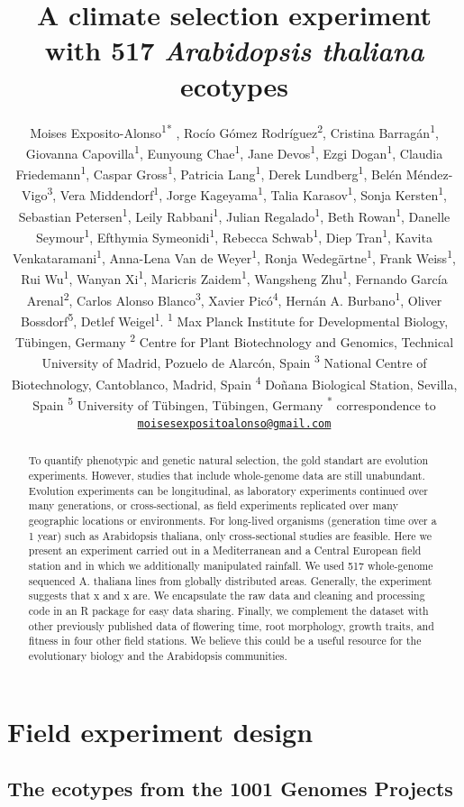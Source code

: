 \documentclass[12pt,]{article}
\title{A climate selection experiment with 517 \emph{Arabidopsis thaliana}
ecotypes}
\author{\newline \normalfont Moises
Exposito-Alonso\textsuperscript{1}\textsuperscript{*} , Rocío Gómez
Rodríguez\textsuperscript{2}, Cristina Barragán\textsuperscript{1},
Giovanna Capovilla\textsuperscript{1}, Eunyoung Chae\textsuperscript{1},
Jane Devos\textsuperscript{1}, Ezgi Dogan\textsuperscript{1}, Claudia
Friedemann\textsuperscript{1}, Caspar Gross\textsuperscript{1}, Patricia
Lang\textsuperscript{1}, Derek Lundberg\textsuperscript{1}, Belén
Méndez-Vigo\textsuperscript{3}, Vera Middendorf\textsuperscript{1},
Jorge Kageyama\textsuperscript{1}, Talia Karasov\textsuperscript{1},
Sonja Kersten\textsuperscript{1}, Sebastian Petersen\textsuperscript{1},
Leily Rabbani\textsuperscript{1}, Julian Regalado\textsuperscript{1},
Beth Rowan\textsuperscript{1}, Danelle Seymour\textsuperscript{1},
Efthymia Symeonidi\textsuperscript{1}, Rebecca
Schwab\textsuperscript{1}, Diep Tran\textsuperscript{1}, Kavita
Venkataramani\textsuperscript{1}, Anna-Lena Van de
Weyer\textsuperscript{1}, Ronja Wedegärtne\textsuperscript{1}, Frank
Weiss\textsuperscript{1}, Rui Wu\textsuperscript{1}, Wanyan
Xi\textsuperscript{1}, Maricris Zaidem\textsuperscript{1}, Wangsheng
Zhu\textsuperscript{1}, Fernando García Arenal\textsuperscript{2},
Carlos Alonso Blanco\textsuperscript{3}, Xavier Picó\textsuperscript{4},
Hernán A. Burbano\textsuperscript{1}, Oliver
Bossdorf\textsuperscript{5}, Detlef Weigel\textsuperscript{1}.
\newline \newline \textsuperscript{1} Max Planck Institute for
Developmental Biology, Tübingen, Germany \newline \textsuperscript{2}
Centre for Plant Biotechnology and Genomics, Technical University of
Madrid, Pozuelo de Alarcón, Spain \newline \textsuperscript{3} National
Centre of Biotechnology, Cantoblanco, Madrid, Spain
\newline \textsuperscript{4} Doñana Biological Station, Sevilla, Spain
\newline \textsuperscript{5} University of Tübingen, Tübingen, Germany
\newline \textsuperscript{*} correspondence to
\href{mailto:moisesexpositoalonso@gmail.com}{\nolinkurl{moisesexpositoalonso@gmail.com}}
\newline \newline \newline \newline \newline \newline}
\date{}
\begin{document}
\maketitle
\begin{abstract}
To quantify phenotypic and genetic natural selection, the gold standart
are evolution experiments. However, studies that include whole-genome
data are still unabundant. Evolution experiments can be longitudinal, as
laboratory experiments continued over many generations, or
cross-sectional, as field experiments replicated over many geographic
locations or environments. For long-lived organisms (generation time
over a 1 year) such as Arabidopsis thaliana, only cross-sectional
studies are feasible. Here we present an experiment carried out in a
Mediterranean and a Central European field station and in which we
additionally manipulated rainfall. We used 517 whole-genome sequenced A.
thaliana lines from globally distributed areas. Generally, the
experiment suggests that x and x are. We encapsulate the raw data and
cleaning and processing code in an R package for easy data sharing.
Finally, we complement the dataset with other previously published data
of flowering time, root morphology, growth traits, and fitness in four
other field stations. We believe this could be a useful resource for the
evolutionary biology and the Arabidopsis communities.
\end{abstract}

\section{Field experiment design}\label{field-experiment-design}

\subsection{The ecotypes from the 1001 Genomes
Projects}\label{the-ecotypes-from-the-1001-genomes-projects}
\end{document}

